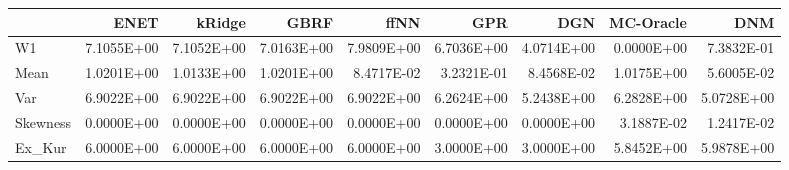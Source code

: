 \begin{tabular}{lrrrrrrrr}
\toprule
{} &       ENET &     kRidge &       GBRF &       ffNN &        GPR &        DGN &  MC-Oracle &        DNM \\
\midrule
W1       & 7.1055E+00 & 7.1052E+00 & 7.0163E+00 & 7.9809E+00 & 6.7036E+00 & 4.0714E+00 & 0.0000E+00 & 7.3832E-01 \\
Mean     & 1.0201E+00 & 1.0133E+00 & 1.0201E+00 & 8.4717E-02 & 3.2321E-01 & 8.4568E-02 & 1.0175E+00 & 5.6005E-02 \\
Var      & 6.9022E+00 & 6.9022E+00 & 6.9022E+00 & 6.9022E+00 & 6.2624E+00 & 5.2438E+00 & 6.2828E+00 & 5.0728E+00 \\
Skewness & 0.0000E+00 & 0.0000E+00 & 0.0000E+00 & 0.0000E+00 & 0.0000E+00 & 0.0000E+00 & 3.1887E-02 & 1.2417E-02 \\
Ex\_Kur   & 6.0000E+00 & 6.0000E+00 & 6.0000E+00 & 6.0000E+00 & 3.0000E+00 & 3.0000E+00 & 5.8452E+00 & 5.9878E+00 \\
\bottomrule
\end{tabular}

